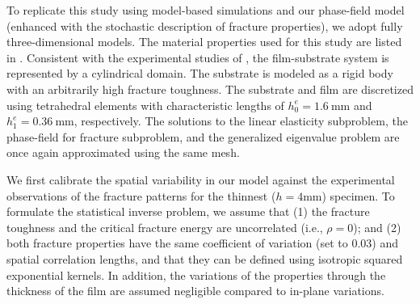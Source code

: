

To replicate this study using model-based simulations and our phase-field model (enhanced with the stochastic description of fracture properties), we adopt fully three-dimensional models.  The material properties used for this study are  listed in .  Consistent with the experimental studies of \cite{Rodriguez2006}, the film-substrate system is represented by a cylindrical domain. The substrate is modeled as a rigid body with an arbitrarily high fracture toughness. The substrate and film are discretized using tetrahedral elements with characteristic lengths of $h^e_0 = \SI{1.6}{\milli\meter}$ and $h^e_1 = \SI{0.36}{\milli\meter}$, respectively. The solutions to the linear elasticity subproblem, the phase-field for fracture subproblem, and the generalized eigenvalue problem are once again approximated using the same mesh.

We first calibrate the spatial variability in our model against the experimental observations of the fracture patterns for the thinnest ($h = 4$mm) specimen. To formulate the statistical inverse problem, we assume that (1) the fracture toughness and the critical fracture energy are uncorrelated (i.e., $\rho = 0$); and (2) both fracture properties have the same coefficient of variation (set to 0.03) and spatial correlation lengths, and that they can be defined using isotropic squared exponential kernels. In addition, the variations of the properties through the thickness of the film are assumed negligible compared to in-plane variations.

